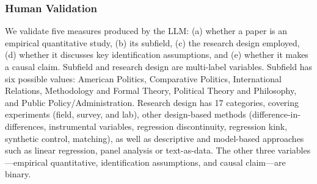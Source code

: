 \documentclass[12pt]{article}
\begin{document}
\clearpage




\subsubsection*{Human Validation}\label{sisec:prompt_validation}

We validate five measures produced by the LLM: (a) whether a paper is an empirical quantitative study, (b) its subfield, (c) the research design employed, (d) whether it discusses key identification assumptions, and (e) whether it makes a causal claim. Subfield and research design are multi-label variables. Subfield has six possible values: American Politics, Comparative Politics, International Relations, Methodology and Formal Theory, Political Theory and Philosophy, and Public Policy/Administration. Research design has 17 categories, covering experiments (field, survey, and lab), other design-based methods (difference-in-differences, instrumental variables, regression discontinuity, regression kink, synthetic control, matching), as well as descriptive and model-based approaches such as linear regression, panel analysis or text-as-data. The other three variables---empirical quantitative, identification assumptions, and causal claim---are binary.

\begin{table}[!ht]
\centering
\caption{Validation Results for LLM-Generated Variables}
\label{tab:validation}
\end{table}
\end{document}
